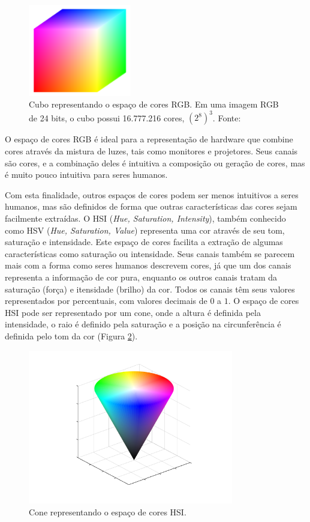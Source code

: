 \begin{figure}[h]
  \centering
  \includegraphics[width=0.4\textwidth]{imgs/rgb_cubo}
  \caption[Cubo do espaço de cores RGB]{Cubo representando o espaço de cores RGB. Em uma imagem RGB de 24 bits, o cubo possui 16.777.216 cores, $(2^8)^3$. Fonte: \cite{gonzalez:2002}}
  \label{fig:rgb_cubo}
\end{figure}

O espaço de cores RGB é ideal para a representação de hardware que combine cores através da mistura de luzes, tais como monitores e projetores. Seus canais são cores, e a combinação deles é intuitiva a composição ou geração de cores, mas é muito pouco intuitiva para seres humanos.

Com esta finalidade, outros espaços de cores podem ser menos intuitivos a seres humanos, mas são definidos de forma que outras características das cores sejam facilmente extraídas. O HSI (\textit{Hue, Saturation, Intensity}), também conhecido como HSV (\textit{Hue, Saturation, Value}) representa uma cor através de seu tom, saturação e intensidade. Este espaço de cores facilita a extração de algumas características como saturação ou intensidade. Seus canais também se parecem mais com a forma como seres humanos descrevem cores, já que um dos canais representa a informação de cor pura, enquanto os outros canais tratam da saturação (força) e itensidade (brilho) da cor. Todos os canais têm seus valores representados por percentuais, com valores decimais de $0$ a $1$. O espaço de cores HSI pode ser representado por um cone, onde a altura é definida pela intensidade, o raio é definido pela saturação e a posição na circunferência é definida pelo tom da cor (Figura \ref{fig:hsi_cone}).

\begin{figure}[h]
  \centering
  \includegraphics[width=0.8\textwidth]{imgs/hsi_cone}
  \caption[Cone do espaço de cores HSI]{Cone representando o espaço de cores HSI.}
  \label{fig:hsi_cone}
\end{figure}

